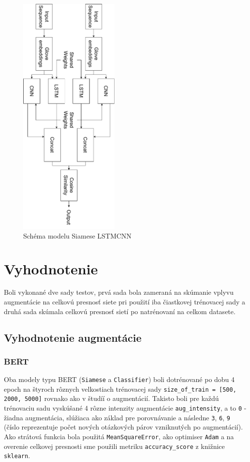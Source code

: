 \documentclass[a4paper, 16pt]{article}
\begin{document}
\begin{figure}[H]
    \centering
    \includegraphics[width=5cm, angle =90 ]{imgs/LSTM_CNN.pdf}
    \caption{Schéma modelu Siamese LSTMCNN}
    \label{fig:6}
\end{figure}


\section{Vyhodnotenie}
\label{vyhodnotenie}

Boli vykonané dve sady testov, prvá sada bola zameraná na skúmanie vplyvu augmentácie na celkovú presnosť siete pri použití iba čiastkovej trénovacej sady a druhá sada skúmala celkovú presnosť sietí po natrénovaní na celkom datasete. 

\subsection{Vyhodnotenie augmentácie}
\subsubsection{BERT}
Oba modely typu BERT (\texttt{Siamese} a \texttt{Classifier}) boli dotrénované po dobu 4 epoch na štyroch rôznych velkostiach trénovacej sady \texttt{size\_of\_train = [500, 2000, 5000]} rovnako ako v študíí o augmentácií. Takisto boli pre každú trénovaciu sadu vyskúšané 4 rôzne intenzity augmentácie \texttt{aug\_intensity}, a to \texttt{0} - žiadna augmentácia, slúžiaca ako základ pre porovnávanie a následne \texttt{3}, \texttt{6}, \texttt{9} (číslo reprezentuje počet nových otázkových párov vzniknutých po augmentácií). Ako strátová funkcia bola použitá \texttt{MeanSquareError}, ako optimiser \texttt{Adam} a na overenie celkovej presnosti sme použili metriku \texttt{accuracy\_score} z knižnice \texttt{sklearn}.
\end{document}
